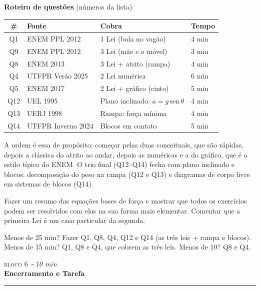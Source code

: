 \documentclass[11pt,a4paper]{article}
\newcommand{\bloco}[3]{%
  \needspace{7\baselineskip}
  \vspace{1.8em}
  {\scshape\color{vinho}bloco #1}\hfill
    {\small\itshape\color{grafite}\textasciitilde\,#3 min}\\[0.1em]
  {\Large\bfseries #2}\\[-0.55em]
  {\color{black!30}\rule{\linewidth}{0.5pt}}
  \par\nobreak\smallskip
}
\begin{document}
\begin{quadro}
\textbf{Roteiro de quest\~oes} (n\'umeros da lista):

\medskip
\begin{tabular}{@{}clll@{}}
  \toprule
  \# & Fonte & Cobra & Tempo \\
  \midrule
  Q1  & ENEM PPL 2012 & 1\textordfeminine{} Lei (bola no vag\~ao)   & 4 min \\
  Q9  & ENEM PPL 2012 & 3\textordfeminine{} Lei (m\~ae e o m\'ovel) & 3 min \\
  Q8  & ENEM 2013     & 3\textordfeminine{} Lei + atrito (rampa)    & 4 min \\
  Q4  & UTFPR Ver\~ao 2025 & 2\textordfeminine{} Lei num\'erica     & 6 min \\
  Q5  & ENEM 2017     & 2\textordfeminine{} Lei + gr\'afico (cinto) & 5 min \\
  Q12 & UEL 1995      & Plano inclinado: $a = g\,\mathrm{sen}\,\theta$ & 4 min \\
  Q13 & UERJ 1998     & Rampa: for\c{c}a m\'inima                   & 4 min \\
  Q14 & UTFPR Inverno 2024 & Blocos em contato                      & 5 min \\
  \bottomrule
\end{tabular}

\medskip
A ordem \'e essa de prop\'osito: come\c{c}ar pelas duas conceituais,
que s\~ao r\'apidas, depois a cl\'assica do atrito ao andar, depois as
num\'ericas e a do
gr\'afico, que \'e o estilo t\'ipico do ENEM. O trio final (Q12--Q14)
fecha com plano inclinado e blocos: decomposi\c{c}\~ao do peso na
rampa (Q12 e Q13) e diagramas de corpo livre em sistemas de blocos
(Q14).


\end{quadro}

\begin{obs}
Fazer um resumo das equações bases de força e mostrar que todos os exercícios podem ser resolvidos
com elas na sua forma mais elementar. Comentar que a primeira Lei é um caso particular da segunda.
\end{obs}

\begin{corte}
Menos de 25 min? Fazer Q1, Q8, Q4, Q12 e Q14 (as tr\^es leis + rampa
e blocos). Menos de 15 min? Q1, Q8 e Q4, que cobrem as tr\^es leis.
Menos de 10? Q8 e Q4.
\end{corte}

\bloco{6}{Encerramento e Tarefa}{10}
\end{document}
